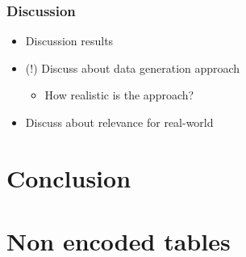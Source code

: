 \documentclass[
    fontsize=12pt,
    headings=small,
    parskip=half,           %
    bibliography=totoc,
    numbers=noenddot,       %
    open=any,               %
    ]{scrreprt}
\begin{document}
\subsection{Discussion}

\begin{itemize}
	\item Discussion results
	\item (!) Discuss about data generation approach
	\begin{itemize}
		\item How realistic is the approach?
	\end{itemize}
	\item Discuss about relevance for real-world
\end{itemize}

\chapter{Conclusion}
\label{chap:conclusion}



\begin{raggedright}         %
  \printbibliography        %
  \label{sec:literaturverzeichnis}
\end{raggedright}


\appendix
\setcounter{figure}{0}
\renewcommand\thetable{A.\arabic{figure}}
\setcounter{table}{0}
\renewcommand\thetable{A.\arabic{table}}
\newpage

\chapter{Non encoded tables}
\end{document}
